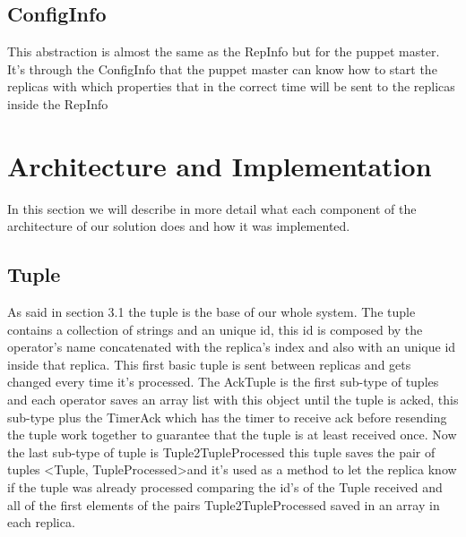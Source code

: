 \documentclass[times, 10pt, twocolumn]{article}
\begin{document}
\subsection{ConfigInfo}
This abstraction is almost the same as the RepInfo but for the puppet master. It's through the ConfigInfo that the puppet master can know how to start the replicas with which properties that in the correct time will be sent to the replicas inside the RepInfo



\section{Architecture and Implementation}
In this section we will describe in more detail what each component of the architecture of our solution does and how it was implemented.




\subsection{Tuple}
As said in section 3.1 the tuple is the base of our whole system. The tuple contains a collection of strings and an unique id, this id is composed by the operator's name concatenated with the replica's index and also with an unique id inside that replica. This first basic tuple is sent between replicas and gets changed every time it's processed. The AckTuple is the first sub-type of tuples and each operator saves an array list with this object until the tuple is acked, this sub-type plus the TimerAck which has the timer to receive ack before resending the tuple work together to guarantee that the tuple is at least received once. Now the last sub-type of tuple is Tuple2TupleProcessed this tuple saves the pair of tuples \textless Tuple, TupleProcessed\textgreater and it's used as a method to let the replica know if the tuple was already processed comparing the id's of the Tuple received and all of the first elements of the pairs Tuple2TupleProcessed saved in an array in each replica.



\end{document}
